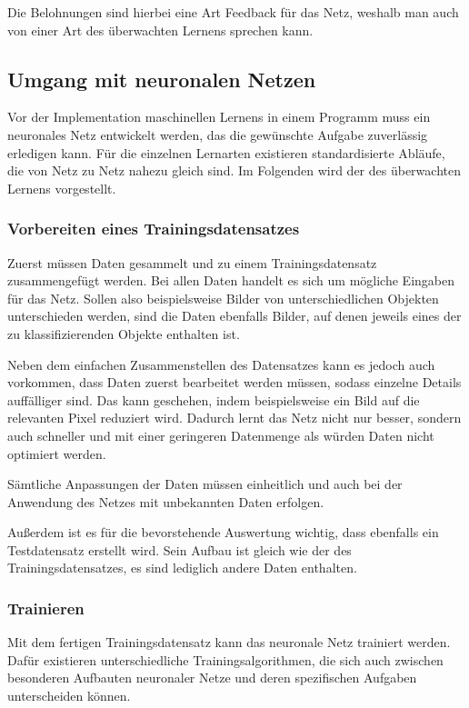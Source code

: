 \documentclass[12pt,a4]{article}
\begin{document}
Die Belohnungen sind hierbei eine Art Feedback für das Netz, weshalb man auch von einer Art des überwachten Lernens sprechen kann.

\subsection{Umgang mit neuronalen Netzen \cite{PythonMachineLearningChapter1}}
Vor der Implementation maschinellen Lernens in einem Programm muss ein neuronales Netz entwickelt werden, das die gewünschte Aufgabe zuverlässig erledigen kann. Für die einzelnen Lernarten existieren standardisierte Abläufe, die von Netz zu Netz nahezu gleich sind. Im Folgenden wird der des überwachten Lernens vorgestellt.

\subsubsection{Vorbereiten eines Trainingsdatensatzes}
Zuerst müssen Daten gesammelt und zu einem Trainingsdatensatz zusammengefügt werden.
Bei allen Daten handelt es sich um mögliche Eingaben für das Netz. Sollen also beispielsweise Bilder von unterschiedlichen Objekten unterschieden werden, sind die Daten ebenfalls Bilder, auf denen jeweils eines der zu klassifizierenden Objekte enthalten ist.

Neben dem einfachen Zusammenstellen des Datensatzes kann es jedoch auch vorkommen, dass Daten zuerst bearbeitet werden müssen, sodass einzelne Details auffälliger sind. Das kann geschehen, indem beispielsweise ein Bild auf die relevanten Pixel reduziert wird. Dadurch lernt das Netz nicht nur besser, sondern auch schneller und mit einer geringeren Datenmenge als würden Daten nicht optimiert werden.

Sämtliche Anpassungen der Daten müssen einheitlich und auch bei der Anwendung des Netzes mit unbekannten Daten erfolgen.

Außerdem ist es für die bevorstehende Auswertung wichtig, dass ebenfalls ein Testdatensatz erstellt wird. Sein Aufbau ist gleich wie der des Trainingsdatensatzes, es sind lediglich andere Daten enthalten. 

\subsubsection{Trainieren}
Mit dem fertigen Trainingsdatensatz kann das neuronale Netz trainiert werden. Dafür existieren unterschiedliche Trainingsalgorithmen, die sich auch zwischen besonderen Aufbauten neuronaler Netze und deren spezifischen Aufgaben unterscheiden können. 
\end{document}
